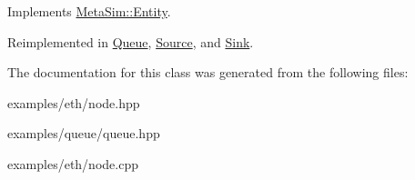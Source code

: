 Implements \hyperlink{classMetaSim_1_1Entity_a8d146c2ea3472c964f84cf20880ac0c9}{Meta\+Sim\+::\+Entity}.



Reimplemented in \hyperlink{classQueue_a130518a0de553ebf8c9f06b838a818ae}{Queue}, \hyperlink{classSource_ac93437b75678d35efaf8b92cdf0092fa}{Source}, and \hyperlink{classSink_a39d08501b759e325aec611e6fc9ef851}{Sink}.



The documentation for this class was generated from the following files\+:\begin{DoxyCompactItemize}
\item 
examples/eth/node.\+hpp\item 
examples/queue/queue.\+hpp\item 
examples/eth/node.\+cpp\end{DoxyCompactItemize}
